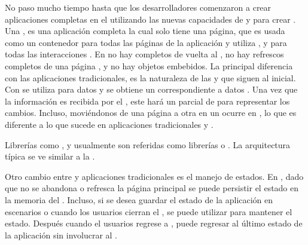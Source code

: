 No paso mucho tiempo hasta que los desarrolladores comenzaron a crear aplicaciones completas en el \browserINT utilizando las nuevas capacidades de \javaScriptNAME y \htmlfive para crear \singlePageAppINT. Una \spa, es una aplicación \webINT completa la cual solo tiene una página, que es usada como un contenedor para todas las páginas \webINT de la aplicación y utiliza \javaScriptNAME, \htmlfive y \cssNAME para todas las interacciones \frontEndsAS. En \spas no hay \posts completos de vuelta al \serverAS, no hay refrescos completos de una página \webINT, y no hay objetos embebidos. La principal diferencia con las aplicaciones \webINT tradicionales, es la naturaleza de las \requests y \responsesINT que siguen al \requestINT \httpNAME inicial. Con \spa se utiliza \ajaxNAME para \requestINT datos y se obtiene un \responsesINT correspondiente a datos \jsonNAME. Una vez que la información es recibida por el \clientAS, este hará un \renderCPT parcial de \htmlNAME para representar los cambios. Incluso, moviéndonos de una página a otra en un \spa ocurre en \clientSideAS, lo que es diferente a lo que sucede en aplicaciones tradicionales y \ria.

Librerías como \backbonejsNAME \emberjsNAME, y \angularjsNAME usualmente son referidas como librerías \clientSideAS \mvcAS o \mvvmAS. La arquitectura típica \clientSideAS \mvcAS se ve similar a la . 




Otro cambio entre \spa y aplicaciones \webINT tradicionales es el manejo de estados. En \spa, dado que no se abandona o refresca la página \webINT principal se puede persistir el estado en la memoria del \browserINT. Incluso, si se desea guardar el estado de la aplicación en escenarios \offline o cuando los usuarios cierran el \browserINT, se puede utilizar \htmlfive \storage para mantener el estado. Después cuando el usuarios regrese a \online, puede regresar al último estado de la aplicación sin involucrar al \serverAS.

